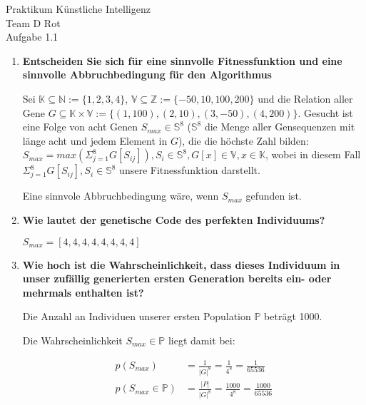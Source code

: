 \documentclass[12pt, twoside]{article}
\begin{document}
\begin{center}
  \Huge{Praktikum Künstliche Intelligenz} \\
  \huge{Team D Rot} \\
  \Large{Aufgabe 1.1} \\
\end{center}

\begin{enumerate}[label={\textbf{\alph*)}}]

  \item \textbf{Entscheiden Sie sich f\"ur eine sinnvolle
          Fitnessfunktion und eine sinnvolle
          Abbruchbedingung f\"ur den Algorithmus}

        Sei $\mathbb{K} \subseteq \mathbb{N}:=\{1,2,3,4\}$,
        $\mathbb{V} \subseteq \mathbb{Z} := \{-50,10,100,
        200\}$ und die Relation aller Gene $G \subseteq
        \mathbb{K} \times \mathbb{V} := \{(1,100), (2,10),
        (3, -50),(4, 200)\}$. Gesucht ist eine Folge von
        acht Genen $S_{max} \in \mathbb{S}^8$
        ($\mathbb{S}^8$ die Menge aller Gensequenzen mit
        l\"ange acht und jedem Element in $G$), die die
        h\"ochste Zahl bilden:
        $S_{max} = max(\Sigma_{j=1}^{8} G[S_{ij}]), S_{i}
        \in \mathbb{S}^8, G[x] \in \mathbb{V}, x \in
        \mathbb{K}$,
        wobei in diesem Fall
        $\Sigma_{j=1}^{8} G[S_{ij}],S_{i} \in \mathbb{S}^8$
        unsere Fitnessfunktion darstellt.

        Eine sinnvole Abbruchbedingung w\"are, wenn
        $S_{max}$ gefunden ist.

  \item \textbf{Wie lautet der genetische Code des
          perfekten Individuums?}

        $S_{max} = [4, 4, 4, 4, 4, 4, 4, 4]$

  \item \textbf{Wie hoch ist die Wahrscheinlichkeit, dass
          dieses Individuum in unser zuf\"allig generierten
          ersten Generation bereits ein- oder mehrmals
          enthalten ist?}

        Die Anzahl an Individuen unserer ersten Population
        $\mathbb{P}$ betr\"agt 1000.

        Die Wahrscheinlichkeit $S_{max} \in \mathbb{P}$
        liegt damit bei:

        \begin{align*}
          p(S_{max}) &= \frac{1}{|G|^{8}} = \frac{1}{4^8}
                     = \frac{1}{65536} \\
          p(S_{max} \in \mathbb{P}) &= \frac{|P|}{|G|^{8}}
                     =\frac{1000}{4^8} = \frac{1000}{65536}
        \end{align*}


\end{enumerate}
\end{document}
